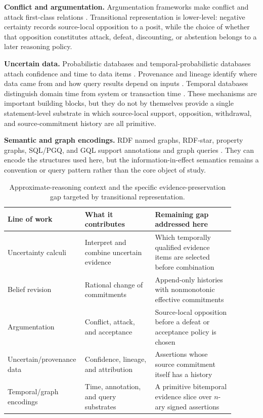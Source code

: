\documentclass[a4paper,fleqn]{cas-sc}
\theoremstyle{plain}
\theoremstyle{remark}
\begin{document}
\textbf{Conflict and argumentation.}
Argumentation frameworks make conflict and attack first-class relations \cite{Dung1995}. Transitional representation is lower-level: negative certainty records source-local opposition to a posit, while the choice of whether that opposition constitutes attack, defeat, discounting, or abstention belongs to a later reasoning policy.

\textbf{Uncertain data.}
Probabilistic databases and temporal-probabilistic databases attach confidence and time to data items \cite{BenjellounEtAl,DyllaEtAl}. Provenance and lineage identify where data came from and how query results depend on inputs \cite{GreenEtAl,CheneyEtAl}. Temporal databases distinguish domain time from system or transaction time \cite{Snodgrass,SQL2011}. These mechanisms are important building blocks, but they do not by themselves provide a single statement-level substrate in which source-local support, opposition, withdrawal, and source-commitment history are all primitive.

\textbf{Semantic and graph encodings.}
RDF named graphs, RDF-star, property graphs, SQL/PGQ, and GQL support annotations and graph queries \cite{CarrollEtAl,HartigChampin,RDF12,FrancisEtAl,SQLPGQ,GQL,DeutschEtAl2021}. They can encode the structures used here, but the information-in-effect semantics remains a convention or query pattern rather than the core object of study.

\begin{table}[t]
\centering
\small
\begin{tabular}{Y{0.25\linewidth} Y{0.30\linewidth} Y{0.34\linewidth}}
\toprule
Line of work & What it contributes & Remaining gap addressed here \\
\midrule
Uncertainty calculi & Interpret and combine uncertain evidence & Which temporally qualified evidence items are selected before combination \\
Belief revision & Rational change of commitments & Append-only histories with nonmonotonic effective commitments \\
Argumentation & Conflict, attack, and acceptance & Source-local opposition before a defeat or acceptance policy is chosen \\
Uncertain/provenance data & Confidence, lineage, and attribution & Assertions whose source commitment itself has a history \\
Temporal/graph encodings & Time, annotation, and query substrates & A primitive bitemporal evidence slice over \(n\)-ary signed assertions \\
\bottomrule
\end{tabular}
\caption{Approximate-reasoning context and the specific evidence-preservation gap targeted by transitional representation.}
\label{Table:gap}
\end{table}
\end{document}
